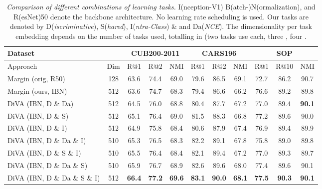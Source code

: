 \documentclass[runningheads]{llncs}
\begin{document}
\begin{table*}[t]
   \label{tab:baselines}
   \setlength\tabcolsep{1.4pt}
   \centering
\begin{tabular}{l|c|ccc|ccc|ccc}
     \toprule
     \multicolumn{2}{l}{Dataset } & \multicolumn{3}{c}{CUB200-2011\cite{cub200-2011}} & \multicolumn{3}{c}{CARS196\cite{cars196}} & 
     \multicolumn{3}{c}{SOP\cite{lifted}} \\
     \midrule
     Approach  & Dim & R@1 & R@2 & NMI & R@1 & R@2 & NMI & R@1 & R@10 & NMI\\
     \midrule
     Margin\cite{margin} (orig, R50)  & 128 & 63.6 & 74.4 & 69.0 & 79.6 & 86.5 & 69.1 & 72.7 & 86.2 & 90.7 \\
     Margin\cite{margin} (ours, IBN) & 512 & 63.6 & 74.7 & 68.3 & 79.4 & 86.6 & 66.2 & 76.6 & 89.2 & 89.8 \\
     \hline
     DiVA (IBN, D \& Da)      & 512 & 64.5 & 76.0 & 68.8 & 80.4 & 87.7 & 67.2 & 77.0 & 89.4 & \textbf{90.1}\\
     DiVA (IBN, D \& S)       & 512 & 65.1 & 76.4 & 69.0 & 81.5 & 88.3 & 66.8 & 77.2 & 89.6 & 90.0\\ 
     DiVA (IBN, D \& I)       & 512 & 64.9 & 75.8 & 68.4 & 80.6 & 87.9 & 67.4 & 76.9 & 89.4 & 89.9\\
     DiVA (IBN, D \& Da \& I) & 510 & 65.3 & 76.5 & 68.3 & 82.2 & 89.1 & 67.8 & 75.8 & 89.0 & 89.8 \\ 
     DiVA (IBN, D \& S \& I)  & 510 & 65.5 & 76.4 & 68.4 & 82.1 & 89.4 & 67.2 & 77.0 & 89.3 & 89.7 \\      
     DiVA (IBN, D \& Da \& S) & 510 & 65.9 & 76.7 & 68.9 & 82.6 & 89.6 & 68.0 & 77.4 & 89.6 & 90.1 \\  
     \hline
     DiVA (IBN, D \& Da \& S \& I) & 512 & \textbf{66.4} & \textbf{77.2} & \textbf{69.6} & \textbf{83.1} & \textbf{90.0} & \textbf{68.1} & \textbf{77.5} & \textbf{90.3} & \textbf{90.1} \\    
     \bottomrule
   \end{tabular}
     \caption{\textit{Comparison of different combinations of learning tasks.} I(nception-V1) B(atch-)N(ormalization), and R(esNet)50 denote the backbone architecture. No learning rate scheduling is used. Our tasks are denoted by D(\textit{iscriminative}), S(\textit{hared}), I(\textit{ntra-Class}) \& and Da(\textit{NCE}). The dimensionality per task embedding depends on the number of tasks used, totalling in  (two tasks use  each, three , four .}
     \label{tab:baselines}
 \end{table*}
 
\end{document}
